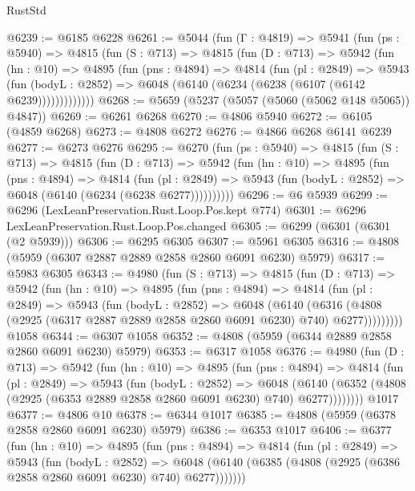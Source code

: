 \begin{lexlean}{RustStd}
\begin{coremodule}
@6239 := @6185 @6228
@6261 := @5044
    (fun (Γ : @4819) =>
    @5941
      (fun (ps : @5940) =>
      @4815
        (fun (S : @713) =>
        @4815
          (fun (D : @713) =>
          @5942
            (fun (hn : @10) =>
            @4895
              (fun (pns : @4894) =>
              @4814
                (fun (pl : @2849) =>
                @5943
                  (fun (bodyL : @2852) =>
                  @6048 (@6140 (@6234 (@6238 (@6107 (@6142 @6239)))))))))))))
@6268 := @5659 (@5237 (@5057 (@5060 (@5062 @148 @5065)) @4847))
@6269 := @6261 @6268
@6270 := @4806 @5940
@6272 := @6105 (@4859 @6268)
@6273 := @4808 @6272
@6276 := @4866 @6268 @6141 @6239
@6277 := @6273 @6276
@6295 := @6270
    (fun (ps : @5940) =>
    @4815
      (fun (S : @713) =>
      @4815
        (fun (D : @713) =>
        @5942
          (fun (hn : @10) =>
          @4895
            (fun (pns : @4894) =>
            @4814
              (fun (pl : @2849) =>
              @5943 (fun (bodyL : @2852) => @6048 (@6140 (@6234 (@6238 @6277))))))))))
@6296 := @6 @5939
@6299 := @6296 (LexLeanPreservation.Rust.Loop.Pos.kept @774)
@6301 := @6296 LexLeanPreservation.Rust.Loop.Pos.changed
@6305 := @6299 (@6301 (@6301 (@2 @5939)))
@6306 := @6295 @6305
@6307 := @5961 @6305
@6316 := @4808 (@5959 (@6307 @2887 @2889 @2858 @2860 @6091 @6230) @5979)
@6317 := @5983 @6305
@6343 := @4980
    (fun (S : @713) =>
    @4815
      (fun (D : @713) =>
      @5942
        (fun (hn : @10) =>
        @4895
          (fun (pns : @4894) =>
          @4814
            (fun (pl : @2849) =>
            @5943
              (fun (bodyL : @2852) =>
              @6048
                (@6140
                  (@6316
                    (@4808 (@2925 (@6317 @2887 @2889 @2858 @2860 @6091 @6230) @740) @6277)))))))))
    @1058
@6344 := @6307 @1058
@6352 := @4808 (@5959 (@6344 @2889 @2858 @2860 @6091 @6230) @5979)
@6353 := @6317 @1058
@6376 := @4980
    (fun (D : @713) =>
    @5942
      (fun (hn : @10) =>
      @4895
        (fun (pns : @4894) =>
        @4814
          (fun (pl : @2849) =>
          @5943
            (fun (bodyL : @2852) =>
            @6048
              (@6140 (@6352 (@4808 (@2925 (@6353 @2889 @2858 @2860 @6091 @6230) @740) @6277))))))))
    @1017
@6377 := @4806 @10
@6378 := @6344 @1017
@6385 := @4808 (@5959 (@6378 @2858 @2860 @6091 @6230) @5979)
@6386 := @6353 @1017
@6406 := @6377
    (fun (hn : @10) =>
    @4895
      (fun (pns : @4894) =>
      @4814
        (fun (pl : @2849) =>
        @5943
          (fun (bodyL : @2852) =>
          @6048 (@6140 (@6385 (@4808 (@2925 (@6386 @2858 @2860 @6091 @6230) @740) @6277)))))))

\end{coremodule}
\end{lexlean}
